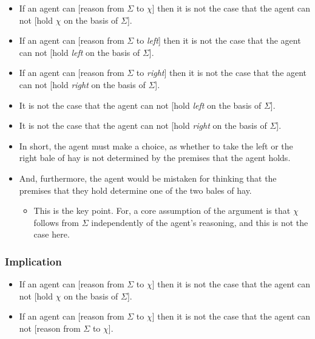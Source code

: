 \documentclass[10pt]{article}
\begin{document}
\begin{itemize}
\item If an agent can [reason from \(\Sigma\) to \(\chi\)] then it is not the case that the agent can not [hold \(\chi\) on the basis of \(\Sigma\)].
\end{itemize}

\begin{itemize}
\item If an agent can [reason from \(\Sigma\) to \emph{left}] then it is not the case that the agent can not [hold \emph{left} on the basis of \(\Sigma\)].
\item If an agent can [reason from \(\Sigma\) to \emph{right}] then it is not the case that the agent can not [hold \emph{right} on the basis of \(\Sigma\)].
\item It is not the case that the agent can not [hold \emph{left} on the basis of \(\Sigma\)].
\item It is not the case that the agent can not [hold \emph{right} on the basis of \(\Sigma\)].
\end{itemize}

\begin{itemize}
\item In short, the agent must make a choice, as whether to take the left or the right bale of hay is not determined by the premises that the agent holds.
\item And, furthermore, the agent would be mistaken for thinking that the premises that they hold determine one of the two bales of hay.
  \begin{itemize}
  \item This is the key point.
    For, a core assumption of the argument is that \(\chi\) follows from \(\Sigma\) independently of the agent's reasoning, and this is not the case here.
  \end{itemize}
\end{itemize}

\subsubsection{Implication}
\label{sec:implication}

\begin{itemize}
\item If an agent can [reason from \(\Sigma\) to \(\chi\)] then it is not the case that the agent can not [hold \(\chi\) on the basis of \(\Sigma\)].
\item If an agent can [reason from \(\Sigma\) to \(\chi\)] then it is not the case that the agent can not [reason from \(\Sigma\) to \(\chi\)].
\end{itemize}
\end{document}
